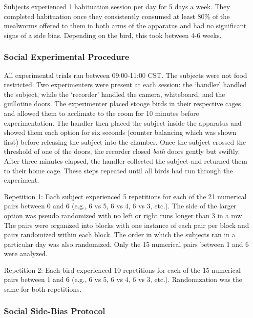 \documentclass[
]{article}
\begin{document}
Subjects experienced 1 habituation session per day for 5 days a week.
They completed habituation once they consistently consumed at least 80\%
of the mealworms offered to them in both arms of the apparatus and had
no significant signs of a side bias. Depending on the bird, this took
between 4-6 weeks.

\hypertarget{social-experimental-procedure}{%
\subsubsection{Social Experimental
Procedure}\label{social-experimental-procedure}}

All experimental trials ran between 09:00-11:00 CST. The subjects were
not food restricted. Two experimenters were present at each session: the
`handler' handled the subject, while the `recorder' handled the camera,
whiteboard, and the guillotine doors. The experimenter placed stooge
birds in their respective cages and allowed them to acclimate to the
room for 10 minutes before experimentation. The handler then placed the
subject inside the apparatus and showed them each option for six seconds
(counter balancing which was shown first) before releasing the subject
into the chamber. Once the subject crossed the threshold of one of the
doors, the recorder closed \emph{both} doors gently but swiftly. After
three minutes elapsed, the handler collected the subject and returned
them to their home cage. These steps repeated until all birds had run
through the experiment.

Repetition 1: Each subject experienced 5 repetitions for each of the 21
numerical pairs between 0 and 6 (e.g., 6 vs 5, 6 vs 4, 6 vs 3, etc.).
The side of the larger option was pseudo randomized with no left or
right runs longer than 3 in a row. The pairs were organized into blocks
with one instance of each pair per block and pairs randomized within
each block. The order in which the subjects ran in a particular day was
also randomized. Only the 15 numerical pairs between 1 and 6 were
analyzed.

Repetition 2: Each bird experienced 10 repetitions for each of the 15
numerical pairs between 1 and 6 (e.g., 6 vs 5, 6 vs 4, 6 vs 3, etc.).
Randomization was the same for both repetitions.

\hypertarget{social-side-bias-protocol}{%
\subsubsection{Social Side-Bias
Protocol}\label{social-side-bias-protocol}}
\end{document}
